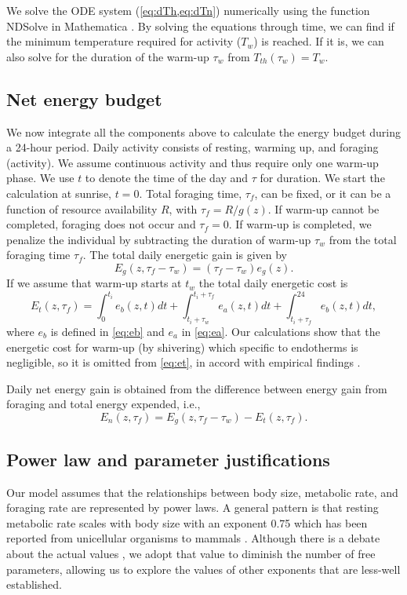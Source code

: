 We solve the ODE system (\cref{eq:dTh,eq:dTn}) numerically using the function NDSolve in Mathematica \nocite{Mathematica10}.
By solving the equations through time, we can find if the minimum temperature  required for activity ($T_w$) is reached. %
If it is, we can also solve for the duration of the warm-up $\tau_w$ from $T_{th}(\tau_w) = T_w$. 

\subsection*{Net energy budget}
We now integrate all the components above to calculate  the energy budget during a 24-hour period.
Daily activity consists of resting, warming up, and foraging (activity).
We assume continuous activity and thus require only one warm-up phase.
We use $t$ to denote the time of the day and $\tau$ for duration.
We start the calculation at sunrise, $t = 0$.
Total foraging time, $\tau_f$, can be fixed, or it can be a function of resource availability $R$, with $\tau_f = R/g(z)$.
If warm-up cannot be completed, foraging does not occur and $\tau_f = 0$.
If warm-up is completed, we penalize the individual by subtracting the duration of warm-up $\tau_w$ from the total foraging time $\tau_f$. 
The total daily energetic gain is given by
\[
	E_g(z,\tau_f - \tau_w) = (\tau_f - \tau_w) e_g(z).
\]
If we assume that warm-up starts at $t_w$  the total daily  energetic cost is
\begin{equation} \label{eq:et}
	E_t(z, \tau_f) = \int_0^{t_i} e_b(z, t) dt + \int_{t_i + \tau_w}^{t_i + \tau_f } e_a(z,t) dt + \int_{t_i+\tau_f}^{24} e_b(z, t) dt,
\end{equation}
where $e_b$ is defined in \cref{eq:eb}  and $e_a$ in \cref{eq:ea}.
Our calculations show that the energetic cost for warm-up (by shivering) which specific to endotherms is negligible, so it is omitted from \cref{eq:et}, in accord with empirical findings \citep{Heinrich1975}.

Daily net energy gain is obtained from the  difference between energy gain from foraging and total energy expended, i.e.,
\[ 
	E_n(z, \tau_f) = E_g(z,\tau_f- \tau_w) - E_t(z, \tau_f).
\]

\subsection*{Power law and parameter justifications} 
Our model assumes that the relationships between body size, metabolic rate, and foraging rate are represented by power laws.
A general pattern is that resting metabolic rate scales with body size with an exponent 0.75  which has been reported from unicellular organisms to mammals \citep{Kleiber1947, Peters1986,Gillooly2001,Brown2004}.
Although there is a debate about the actual values \citep[e.g.,][]{Isaac2010}, we adopt that value to diminish the number of free parameters, allowing us to explore the values of other exponents that are less-well established.

